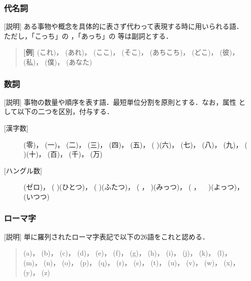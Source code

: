 \subsubsection{代名詞}        
[説明] ある事物や概念を具体的に表さず代わって表現する時に用いられる語．
ただし，「こっち」の
，「あっち」の
等は副詞とする．

\begin{quote}
{\bf [例]} 
(これ)，
(あれ)，
(ここ)，
(そこ)，
(あちこち)，
(どこ)，
(彼)，
(私)，
(僕)，
(あなた)
\end{quote}


\subsubsection{数詞}        
[説明] 事物の数量や順序を表す語．最短単位分割を原則とする．なお，属性
として以下の二つを区別，付与する．

\begin{description}
\item[{[漢字数]}]
(零)，
(一)，
(二)，
(三)，
(四)，
(五)，
(
)(六)，
(七)，
(八)，
(九)，
(
)(十)，
(百)，
(千)，
(万)
        
\item[{[ハングル数]}]
(ゼロ)，
(
)(ひとつ)，
(
)(ふたつ)，
(
，
)(みっつ)，
(
，
\ 
)(よっつ)，
(いつつ)
\end{description}



\subsubsection{ローマ字}        
[説明] 単に羅列されたローマ字表記で以下の26語をこれと認める．

\begin{quote}
(a)，
(b)，
(c)，
(d)，
(e)，
(f)，
(g)，
(h)，
(i)，
(j)，
(k)，
(l)，
(m)，
(n)，
(o)，
(p)，
(q)，
(r)，
(s)，
(t)，
(u)，
(v)，
(w)，
(x)，
(y)，
(z)
\end{quote}


